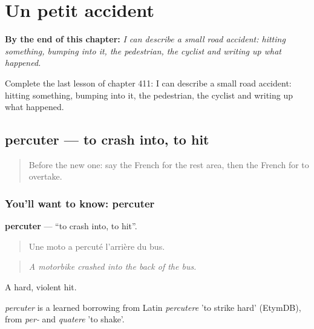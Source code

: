 
\chapter{Un petit accident}
\label{ch:fr-un-petit-accident}

\begin{chapteropening}
\textbf{By the end of this chapter:} \emph{I can describe a small road accident: hitting something, bumping into it, the pedestrian, the cyclist and writing up what happened.}

Complete the last lesson of chapter 411: I can describe a small road accident: hitting something, bumping into it, the pedestrian, the cyclist and writing up what happened.
\end{chapteropening}

\section[percuter]{percuter — to crash into, to hit}

\label{lesson:FR-C411-percuter}



\begin{quote}
Before the new one: say the French for the rest area, then the French for to overtake.
\end{quote}

\subsection*{You'll want to know: percuter}
\textbf{percuter} — \textquotedblleft{}to crash into, to hit\textquotedblright{}.

\begin{quote}
Une moto a percuté l'arrière du bus.
\end{quote}

\begin{quote}
\emph{A motorbike crashed into the back of the bus.}
\end{quote}

A hard, violent hit.

\begin{cousinweb}
\emph{percuter} is a learned borrowing from Latin \emph{percutere} 'to strike hard' (EtymDB), from \emph{per-} and \emph{quatere} 'to shake'.
\end{cousinweb}

